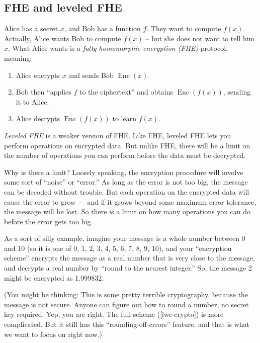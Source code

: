 \subsection{FHE and leveled FHE}\label{fhe-intro}

Alice has a secret \(x\), and Bob has a function \(f\). They want to
compute \(f(x)\). Actually, Alice wants Bob to compute \(f(x)\) -- but
she does not want to tell him \(x\). What Alice wants is a \emph{fully
homomorphic encryption (FHE)} protocol, meaning:

\begin{enumerate}
\item
  Alice encrypts \(x\) and sends Bob \(\operatorname{Enc}(x)\).
\item
  Bob then ``applies \(f\) to the ciphertext'' and obtains
  \(\operatorname{Enc}\left( f(x) \right)\), sending it to Alice.
\item
  Alice decrypts \(\operatorname{Enc}\left( f(x) \right)\) to learn
  \(f(x)\).
\end{enumerate}

\emph{Leveled FHE} is a weaker version of FHE. Like FHE, leveled FHE
lets you perform operations on encrypted data. But unlike FHE, there
will be a limit on the number of operations you can perform before the
data must be decrypted.

Why is there a limit? Loosely speaking, the encryption procedure will
involve some sort of ``noise'' or ``error.'' As long as the error is not
too big, the message can be decoded without trouble. But each operation
on the encrypted data will cause the error to grow --- and if it grows
beyond some maximum error tolerance, the message will be lost. So there
is a limit on how many operations you can do before the error gets too
big.

As a sort of silly example, imagine your message is a whole number
between 0 and 10 (so it is one of 0, 1, 2, 3, 4, 5, 6, 7, 8, 9, 10), and
your ``encryption scheme'' encrypts the message as a real number that is
very close to the message, and decrypts a real number by ``round to the
nearest integer.'' So, the message 2 might be encrypted as 1.999832.

(You might be thinking: This is some pretty terrible cryptography,
because the message is not secure. Anyone can figure out how to round a
number, no secret key required. Yep, you are right. The full scheme
({[}lwe-crypto{]}) is more complicated. But it still has this
``rounding-off-errors'' feature, and that is what we want to focus on
right now.)

